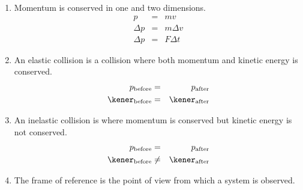 \begin{enumerate}
\item Momentum is conserved in one and two dimensions.\\
\begin{eqnarray*}
p&=&mv\\
\Delta p&=& m\Delta v\\
\Delta p&=& F\Delta t
\end{eqnarray*}
\item An elastic collision is a collision where both momentum and kinetic energy is conserved.
\begin{eqnarray*}
p_{\rm{before}}&=&p_{\rm{after}}\\
\kener_{\rm{before}}&=&\kener_{\rm{after}}
\end{eqnarray*}
\item An inelastic collision is where momentum is conserved but kinetic energy is not conserved.
\begin{eqnarray*}
p_{\rm{before}}&=&p_{\rm{after}}\\
\kener_{\rm{before}}&\neq&\kener_{\rm{after}}
\end{eqnarray*}
\item The frame of reference is the point of view from which a system is observed.
\end{enumerate}



